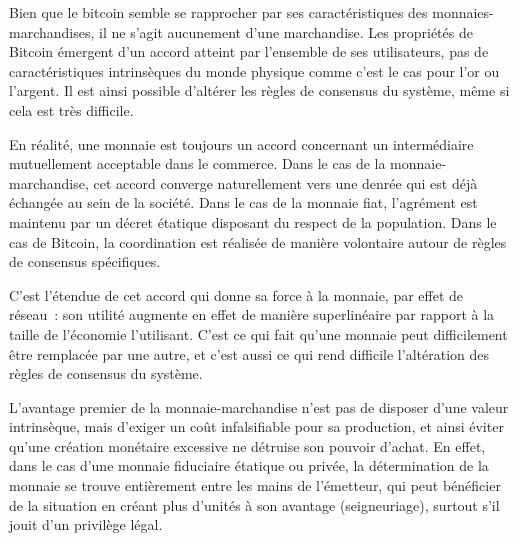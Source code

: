Bien que le bitcoin semble se rapprocher par ses caractéristiques des monnaies-marchandises, il ne s'agit aucunement d'une marchandise. Les propriétés de Bitcoin émergent d'un accord atteint par l'ensemble de ses utilisateurs, pas de caractéristiques intrinsèques du monde physique comme c'est le cas pour l'or ou l'argent. Il est ainsi possible d'altérer les règles de consensus du système, même si cela est très difficile.

En réalité, une monnaie est toujours un accord concernant un intermédiaire mutuellement acceptable dans le commerce. Dans le cas de la monnaie-marchandise, cet accord converge naturellement vers une denrée qui est déjà échangée au sein de la société. Dans le cas de la monnaie fiat, l'agrément est maintenu par un décret étatique disposant du respect de la population. Dans le cas de Bitcoin, la coordination est réalisée de manière volontaire autour de règles de consensus spécifiques.

C'est l'étendue de cet accord qui donne sa force à la monnaie, par effet de réseau~: son utilité augmente en effet de manière superlinéaire par rapport à la taille de l'économie l'utilisant. C'est ce qui fait qu'une monnaie peut difficilement être remplacée par une autre, et c'est aussi ce qui rend difficile l'altération des règles de consensus du système.

L'avantage premier de la monnaie-marchandise n'est pas de disposer d'une valeur intrinsèque, mais d'exiger un coût infalsifiable pour sa production, et ainsi éviter qu'une création monétaire excessive ne détruise son pouvoir d'achat. En effet, dans le cas d'une monnaie fiduciaire étatique ou privée, la détermination de la monnaie se trouve entièrement entre les mains de l'émetteur, qui peut bénéficier de la situation en créant plus d'unités à son avantage (seigneuriage), surtout s'il jouit d'un privilège légal.

